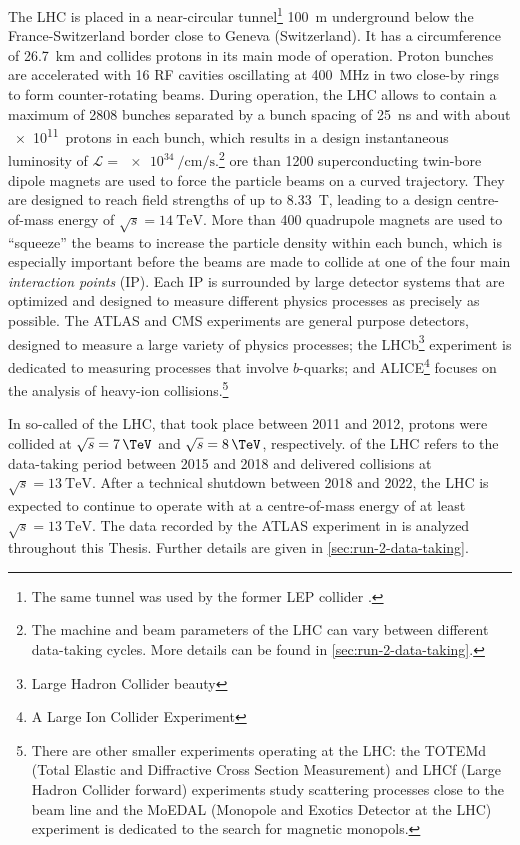 The LHC is placed in a near-circular tunnel\footnote{The same tunnel was used by the former LEP collider \cites{LEPDesignReport}.} \SI{100}{\m} underground below the France-Switzerland border close to Geneva (Switzerland). It has a circumference of \SI{26.7}{\km} and collides protons in its main mode of operation. Proton bunches are accelerated with 16 RF cavities oscillating at \SI{400}{\mega\hertz} in two close-by rings to form counter-rotating beams. During operation, the LHC allows to contain a maximum of 2808 bunches separated by a bunch spacing of \SI{25}{\ns} and with about \SI{e11}{protons} in each bunch, which results in a design instantaneous luminosity of $\mathcal{L} = \SI{e34}{\per\cm\per\s}$.\footnote{The machine and beam parameters of the LHC can vary between different data-taking cycles. More details can be found in \cref{sec:run-2-data-taking}.}
 ore than 1200 superconducting twin-bore dipole magnets are used to force the particle beams on a curved trajectory.
They are designed to reach field strengths of up to \SI{8.33}{\tesla}, leading to a design centre-of-mass energy of $\sqrt{s} = \SI{14}{\TeV}$. More than 400 quadrupole magnets are used to ``squeeze'' the beams to increase the particle density within each bunch, which is especially important before the beams are made to collide at one of the four main \emph{interaction points} (IP). Each IP is surrounded by large detector systems that are optimized and designed to measure different physics processes as precisely as possible.
The ATLAS and CMS \cite{CMS-TDR-08-001} experiments are general purpose detectors, designed to measure a large variety of physics processes; the LHCb\footnote{Large Hadron Collider beauty} experiment \cite{1748-0221-3-08-S08005} is dedicated to measuring processes that involve $b$-quarks; and ALICE\footnote{A Large Ion Collider Experiment} \cite{1748-0221-3-08-S08002} focuses on the analysis of heavy-ion collisions.\footnote{There are other smaller experiments operating at the LHC: the TOTEMd (Total Elastic and Diffractive Cross Section Measurement) \cite{1748-0221-3-08-S08007} and LHCf (Large Hadron Collider forward) \cite{1748-0221-3-08-S08006} experiments study scattering processes close to the beam line and the MoEDAL (Monopole and Exotics Detector at the LHC) experiment \cite{1742-6596-631-1-012014} is dedicated to the search for magnetic monopols.}

In so-called \RunOne of the LHC, that took place between 2011 and 2012, protons were collided at $\sqrt{s} = 7\,\TeV$ and $\sqrt{s} = 8\,\TeV$, respectively. \RunTwo of the LHC refers to the data-taking period between 2015 and 2018 and delivered collisions at $\sqrt{s} = \SI{13}{\TeV}$. After a technical shutdown between 2018 and 2022, the LHC is expected to continue to operate with \RunThr at a centre-of-mass energy of at least $\sqrt{s} = \SI{13}{\TeV}$.
The data recorded by the ATLAS experiment in \RunTwo is analyzed throughout this Thesis. Further details are given in \cref{sec:run-2-data-taking}.



